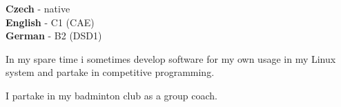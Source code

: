 \documentclass[9pt]{developercv} %
\begin{document}
\begin{minipage}[t]{0.3\textwidth}
	\vspace{-\baselineskip} %

	
	\textbf{Czech} - native\\
	\textbf{English} - C1 (CAE)\\
	\textbf{German} - B2 (DSD1)
\end{minipage}
\hfill
\begin{minipage}[t]{0.3\textwidth}
	\vspace{-\baselineskip} %
	
	
	In my spare time i sometimes develop software for my own usage in my Linux system and partake in competitive programming.
\end{minipage}
\hfill
\begin{minipage}[t]{0.3\textwidth}
	\vspace{-\baselineskip} %
	
	
	I partake in my badminton club as a group coach.
\end{minipage}

\end{document}
